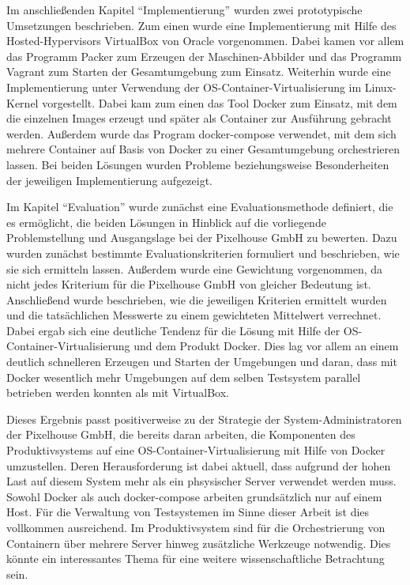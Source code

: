Im anschließenden Kapitel "`Implementierung"' wurden zwei prototypische Umsetzungen beschrieben. Zum einen wurde eine Implementierung mit Hilfe des Hosted-Hypervisors VirtualBox von Oracle vorgenommen. Dabei kamen vor allem das Programm Packer zum Erzeugen der Maschinen-Abbilder und das Programm Vagrant zum Starten der Gesamtumgebung zum Einsatz. Weiterhin wurde eine Implementierung unter Verwendung der OS-Container-Virtualisierung im Linux-Kernel vorgestellt. Dabei kam zum einen das Tool Docker zum Einsatz, mit dem die einzelnen Images erzeugt und später als Container zur Ausführung gebracht werden. Außerdem wurde das Program docker-compose verwendet, mit dem sich mehrere Container auf Basis von Docker zu einer Gesamtumgebung orchestrieren lassen. Bei beiden Lösungen wurden Probleme beziehungsweise Besonderheiten der jeweiligen Implementierung aufgezeigt.

Im Kapitel "`Evaluation"' wurde zunächst eine Evaluationsmethode definiert, die es ermöglicht, die beiden Lösungen in Hinblick auf die vorliegende Problemstellung und Ausgangslage bei der Pixelhouse GmbH zu bewerten. Dazu wurden zunächst bestimmte Evaluationskriterien formuliert und beschrieben, wie sie sich ermitteln lassen. Außerdem wurde eine Gewichtung vorgenommen, da nicht jedes Kriterium für die Pixelhouse GmbH von gleicher Bedeutung ist. Anschließend wurde beschrieben, wie die jeweiligen Kriterien ermittelt wurden und die tatsächlichen Messwerte zu einem gewichteten Mittelwert verrechnet. Dabei ergab sich eine deutliche Tendenz für die Lösung mit Hilfe der OS-Container-Virtualisierung und dem Produkt Docker. Dies lag vor allem an einem deutlich schnelleren Erzeugen und Starten der Umgebungen und daran, dass mit Docker wesentlich mehr Umgebungen auf dem selben Testsystem parallel betrieben werden konnten als mit VirtualBox.

Dieses Ergebnis passt positiverweise zu der Strategie der System-Administratoren der Pixelhouse GmbH, die bereits daran arbeiten, die Komponenten des Produktivsystems auf eine OS-Container-Virtualisierung mit Hilfe von Docker umzustellen. Deren Herausforderung ist dabei aktuell, dass aufgrund der hohen Last auf diesem System mehr als ein phsysischer Server verwendet werden muss. Sowohl Docker als auch docker-compose arbeiten grundsätzlich nur auf einem Host. Für die Verwaltung von Testsystemen im Sinne dieser Arbeit ist dies vollkommen ausreichend. Im Produktivsystem sind für die Orchestrierung von Containern über mehrere Server hinweg zusätzliche Werkzeuge notwendig. Dies könnte ein interessantes Thema für eine weitere wissenschaftliche Betrachtung sein.

